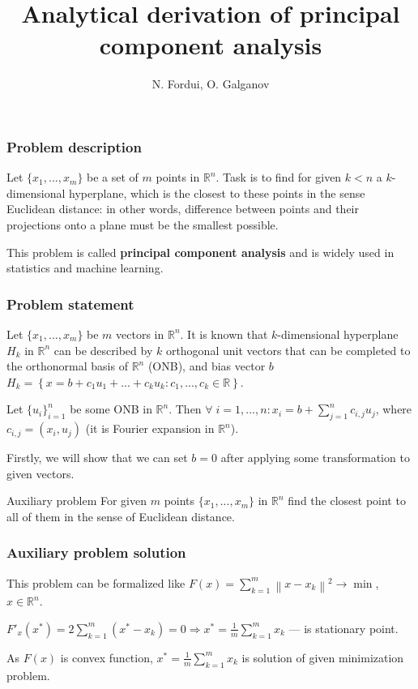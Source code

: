 \documentclass[10pt,pdf]{beamer}
\title{Analytical derivation of principal component analysis}
\author{N. Fordui, O. Galganov}
\date{}
\newcommand{\norm}[1]{\left\lVert#1\right\rVert}
\newcommand{\dotprod}[2]{\left(#1, #2\right)}
\begin{document}
    \begin{frame}
        \titlepage
    \end{frame}
    \begin{frame}
        \frametitle{Problem description}
        Let $\{{x_1}, ..., {x_m}\}$ be a set of $m$ points in $\mathbb{R}^n$.
        Task is to find for given $k < n$ a $k$-dimensional hyperplane, which is
        the closest to these points in the sense Euclidean distance: in other words, difference between
        points and their projections onto a plane must be the smallest possible.

        This problem is called \textbf{principal component analysis} and is widely used in
        statistics and machine learning.
    \end{frame}
    \begin{frame}
        \frametitle{Problem statement}
        Let $\{{x_1}, ..., {x_m}\}$ be $m$ vectors in $\mathbb{R}^n$.
        It is known that $k$-dimensional hyperplane $H_k$ in $\mathbb{R}^n$ can be described by $k$ orthogonal unit
        vectors that can be completed to the orthonormal basis of $\mathbb{R}^n$ (ONB), 
        and bias vector ${b}$
        $H_k = \left\{ x = b + c_1 u_1 + ... + c_k u_k : c_1,...,c_k \in \mathbb{R}\right\}$.

        Let $\{{u_i}\}_{i=1}^n$ be some ONB in $\mathbb{R}^n$. Then
        $\forall \; i =1,...,n:{x_i} = {b} + \sum\limits_{j=1}^nc_{i, j}u_j$, where $c_{i, j} = \dotprod{x_i}{u_j}$
        (it is Fourier expansion in $\mathbb{R}^n$).

        Firstly, we will show that we can set $b=0$ after applying some transformation to given vectors.
        \begin{block}{Auxiliary problem}
            For given $m$ points $\{{x_1}, ..., {x_m}\}$ in $\mathbb{R}^n$
            find the closest point to all of them in the sense of Euclidean distance.
        \end{block}
    \end{frame}
    \begin{frame}
        \frametitle{Auxiliary problem solution}
        This problem can be formalized like $F(x) = \sum\limits_{k=1}^m \norm{x - x_k}^2 \to \min$, $x \in \mathbb{R}^n$.
        
        $F'_{x} (x^\ast) = 2 \sum\limits_{k=1}^m (x^\ast - x_k) = 0 \Rightarrow x^\ast = \frac{1}{m} \sum\limits_{k=1}^m x_k$ --- is stationary point.

        As $F(x)$ is convex function, $x^\ast = \frac{1}{m} \sum\limits_{k=1}^m x_k$ is solution of given minimization problem.
    \end{frame}
\end{document}
